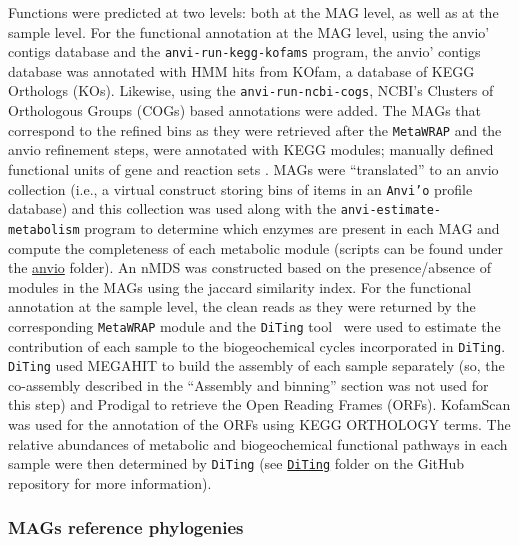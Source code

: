    Functions were predicted at two levels: both at the MAG level, as well as at the sample level. 
   For the functional annotation at the MAG level, using the anvio’ contigs database and the \texttt{anvi-run-kegg-kofams} program, 
   the anvio’ contigs database was annotated with HMM hits from KOfam, a database of KEGG Orthologs (KOs). 
   Likewise, using the \texttt{anvi-run-ncbi-cogs}, NCBI’s Clusters of Orthologous Groups (COGs) based annotations were added. 
   The MAGs that correspond to the refined bins as they were retrieved after the \texttt{MetaWRAP} and the anvio refinement steps, were annotated with KEGG modules; 
   manually defined functional units of gene and reaction sets \citep{kanehisa_kegg_2012}. 
   MAGs were “translated” to an anvio collection (i.e., a virtual construct storing bins of items in an \texttt{Anvi’o} profile database) and this collection was used 
   along with the \texttt{anvi-estimate-metabolism} program to determine which enzymes are present in each MAG and compute the completeness of each metabolic
   module (scripts can be found under the \href{https://github.com/hariszaf/karpathos-swamp/tree/main/anvio}{anvio} folder). 
   An nMDS was constructed based on the presence/absence of modules in the MAGs using the jaccard similarity index. 
   For the functional annotation at the sample level, the clean reads as they were returned by the corresponding \texttt{MetaWRAP} module and the \texttt{DiTing} tool~\citep{xue_diting_2021} 
   were used to estimate the contribution of each sample to the biogeochemical cycles incorporated in \texttt{DiTing}. 
   \texttt{DiTing} used MEGAHIT \citep{li_megahit_2015} to build the assembly of each sample separately (so, the co-assembly described in the “Assembly and binning” section was not used for this step) 
   and Prodigal to retrieve the Open Reading Frames (ORFs). 
   KofamScan \citep{aramaki_kofamkoala_2020} was used for the annotation of the ORFs using KEGG ORTHOLOGY terms. 
   The relative abundances of metabolic and biogeochemical functional pathways in each sample were then determined by \texttt{DiTing} 
   (see \href{https://github.com/hariszaf/karpathos-swamp/tree/main/DiTing}{\texttt{DiTing}} folder on the GitHub repository for more information). 


\subsubsection*{MAGs reference phylogenies}

